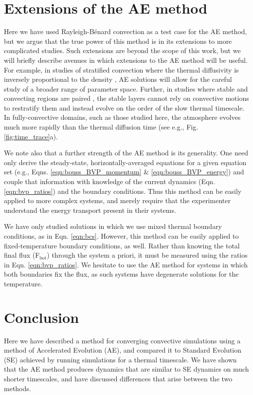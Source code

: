 \documentclass[aps, pre, onecolumn, nofootinbib, notitlepage, groupedaddress, amsfonts, amssymb, amsmath, longbibliography]{revtex4-1}
\newcommand{\RB}{Rayleigh-B\'{e}nard }
\begin{document}
\section{Extensions of the AE method}
\label{sec:extensions}
Here we have used \RB convection as a test case for the AE method, but we argue that
the true power of this method is in its extensions to more complicated studies.
Such extensions are beyond the scope of this work, but we will briefly describe
avenues in which extensions to the AE method will be useful.
For example, in studies of stratified convection where the thermal diffusivity
is inversely proportional to the density \cite{anders&brown2017}, AE solutions
will allow for the careful study of a broader range of parameter space. 
Further, in studies where stable and convecting regions are paired
\cite{hurlburt&all1986, couston&all2017}, the stable layers cannot rely on convective
motions to restratify them and instead evolve on the order of the slow thermal
timescale. In
fully-convective domains, such as those studied here, the atmosphere evolves
much more rapidly than the thermal diffusion time (see e.g., Fig. \ref{fig:time_trace}a).

We note also that a further strength of the AE method is its generality.  One
need only derive the steady-state, horizontally-averaged equations for a given
equation set (e.g., Eqns. \ref{eqn:bouss_BVP_momentum} \& \ref{eqn:bouss_BVP_energy})
and couple that information with knowledge of the current dynamics (Eqn. \ref{eqn:bvp_ratios})
and the boundary conditions. Thus this method can be easily applied to more complex
systems, and merely require that the experimenter understand the energy transport
present in their systems.

We have only studied solutions in which we use mixed thermal boundary conditions,
as in Eqn. \ref{eqn:bcs}. However, this method can be easily applied to fixed-temperature
boundary conditions, as well.  Rather than knowing the total final flux (F$_{\text{bot}}$)
through the system a priori, it must be measured using the ratios in
Eqn. \ref{eqn:bvp_ratios}.  We hesitate to use the AE method for systems in which
both boundaries fix the flux, as such systems have degenerate solutions for the temperature.


\section{Conclusion}
\label{sec:conclusion}
Here we have described a method for converging convective simulations using
a method of Accelerated Evolution (AE), and compared it to Standard
Evolution (SE) achieved by running simulations for a thermal timescale.
We have shown that the AE method produces dynamics that are similar to SE
dynamics on much shorter timescales, and have discussed differences that arise
between the two methods.
\end{document}
